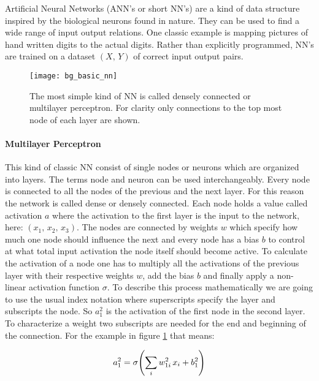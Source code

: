 Artificial Neural Networks (ANN's or short NN's) are a kind of data structure inspired by the biological neurons found in nature. They can be used to find a wide range of input output relations. One classic example is mapping pictures of hand written digits to the actual digits. Rather than explicitly programmed, NN's are trained on a dataset $(X, \, Y)$ of correct input output pairs.
\\


\begin{figure}[H]
    \centering
    \texttt{[image: bg\_basic\_nn]}
    \caption{The most simple kind of NN is called densely connected or multilayer perceptron. For clarity only connections to the top most node of each layer are shown.}
    \label{fig:bg:basic_nn}
\end{figure}

\paragraph{Multilayer Perceptron}
This kind of classic NN consist of single nodes or neurons which are organized into layers. The terms node and neuron can be used interchangeably. Every node is connected to all the nodes of the previous and the next layer. For this reason the network is called dense or densely connected. Each node holds a value called activation $a$ where the activation to the first layer is the input to the network, here:
$(x_1, \, x_2, \, x_3)$.
The nodes are connected by weights $w$ which specify how much one node should influence the next and every node has a bias $b$ to control at what total input activation the node itself should become active.
To calculate the activation of a node one has to multiply all the activations of the previous layer with their respective weights $w$, add the bias $b$ and finally apply a non-linear activation function $\sigma$. To describe this process mathematically we are going to use the usual index notation where superscripts specify the layer and subscripts the node. So $a^2_1$ is the activation of the first node in the second layer. To characterize a weight two subscripts are needed for the end and beginning of the connection. For the example in figure \ref{fig:bg:basic_nn} that means:

\begin{equation} \label{eq:bg:activation_example}
    a^2_1 = \sigma \qty(\sum_i w^2_{1i} \, x_i + b^2_1)
\end{equation}

